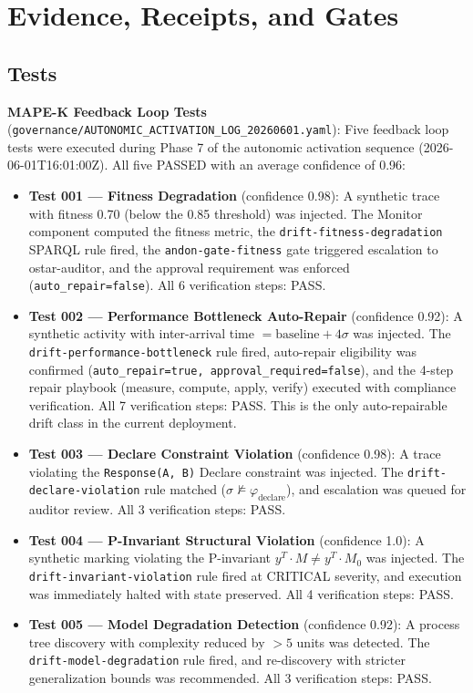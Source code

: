 
\section{Evidence, Receipts, and Gates}
\label{sec:research-pi-program-evidence}

\subsection{Tests}
\label{sec:research-pi-program-evidence-tests}

\textbf{MAPE-K Feedback Loop Tests} (\texttt{governance/AUTONOMIC\_ACTIVATION\_LOG\_20260601.yaml}): Five feedback loop tests were executed during Phase 7 of the autonomic activation sequence (2026-06-01T16:01:00Z). All five PASSED with an average confidence of 0.96:

\begin{itemize}
  \item \textbf{Test 001 --- Fitness Degradation} (confidence 0.98): A synthetic trace with fitness 0.70 (below the 0.85 threshold) was injected. The Monitor component computed the fitness metric, the \texttt{drift-fitness-degradation} SPARQL rule fired, the \texttt{andon-gate-fitness} gate triggered escalation to ostar-auditor, and the approval requirement was enforced (\texttt{auto\_repair=false}). All 6 verification steps: PASS.
  \item \textbf{Test 002 --- Performance Bottleneck Auto-Repair} (confidence 0.92): A synthetic activity with inter-arrival time $= \text{baseline} + 4\sigma$ was injected. The \texttt{drift-performance-bottleneck} rule fired, auto-repair eligibility was confirmed (\texttt{auto\_repair=true, approval\_required=false}), and the 4-step repair playbook (measure, compute, apply, verify) executed with compliance verification. All 7 verification steps: PASS. This is the only auto-repairable drift class in the current deployment.
  \item \textbf{Test 003 --- Declare Constraint Violation} (confidence 0.98): A trace violating the \texttt{Response(A, B)} Declare constraint was injected. The \texttt{drift-declare-violation} rule matched ($\sigma \not\models \varphi_{\mathrm{declare}}$), and escalation was queued for auditor review. All 3 verification steps: PASS.
  \item \textbf{Test 004 --- P-Invariant Structural Violation} (confidence 1.0): A synthetic marking violating the P-invariant $y^T \cdot M \neq y^T \cdot M_0$ was injected. The \texttt{drift-invariant-violation} rule fired at CRITICAL severity, and execution was immediately halted with state preserved. All 4 verification steps: PASS.
  \item \textbf{Test 005 --- Model Degradation Detection} (confidence 0.92): A process tree discovery with complexity reduced by $> 5$ units was detected. The \texttt{drift-model-degradation} rule fired, and re-discovery with stricter generalization bounds was recommended. All 3 verification steps: PASS.
\end{itemize}

